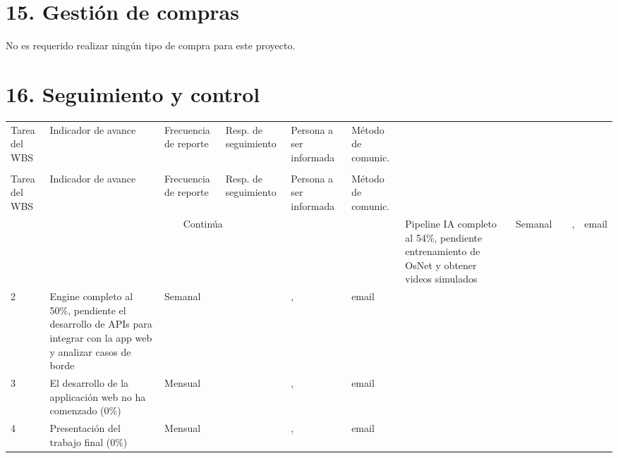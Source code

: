 \documentclass[11pt]{charter}
\begin{document}
\section{15. Gestión de compras}
\label{sec:compras}

No es requerido realizar ningún tipo de compra para este proyecto.

\newpage

\section{16. Seguimiento y control}
\label{sec:seguimiento}

\begin{longtable}{|m{1cm}|m{3.5cm}|m{2.2cm}|m{2cm}|m{3cm}|m{1.5cm}|}
\hline
\rowcolor[HTML]{C0C0C0} 
\multicolumn{6}{|c|}{\cellcolor[HTML]{C0C0C0}SEGUIMIENTO DE AVANCE}                                                                       \\ \hline
\rowcolor[HTML]{C0C0C0} 
Tarea del WBS 			& Indicador de avance & Frecuencia de reporte & Resp. de seguimiento & Persona a ser informada & Método de comunic. \\ \hline
\endfirsthead

\hline
\rowcolor[HTML]{C0C0C0} 
\multicolumn{6}{c}{\cellcolor[HTML]{C0C0C0}SEGUIMIENTO DE AVANCE}                                                                       \\ \hline
\rowcolor[HTML]{C0C0C0} 
Tarea del WBS 			& Indicador de avance & Frecuencia de reporte & Resp. de seguimiento & Persona a ser informada & Método de comunic. \\ \hline
\endhead

\multicolumn{6}{c}{Continúa}
\endfoot

\endlastfoot

1	& Pipeline IA completo al 54\%, pendiente entrenamiento de OsNet y obtener videos simulados  & Semanal & \authorname & \clientename, \supname & email \\ \hline
2	& Engine completo al 50\%, pendiente el desarrollo de APIs para integrar con la app web y analizar casos de borde & Semanal & \authorname & \clientename, \supname & email \\ \hline
3	& El desarrollo de la applicación web no ha comenzado (0\%) & Mensual & \authorname & \clientename, \supname & email \\ \hline
4	& Presentación del trabajo final (0\%) & Mensual & \authorname & \clientename, \supname & email \\ \hline

\end{longtable}
\end{document}
